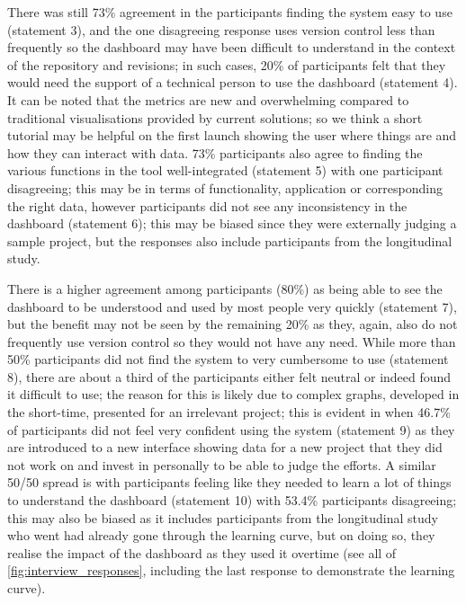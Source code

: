 \documentclass[../mpaper.tex]{subfiles}
\begin{document}
There was still 73\% agreement in the participants finding the system easy to use (statement 3), and the one disagreeing response uses version control less than frequently so the dashboard may have been difficult to understand in the context of the repository and revisions; in such cases, 20\% of participants felt that they would need the support of a technical person to use the dashboard (statement 4). It can be noted that the metrics are new and overwhelming compared to traditional visualisations provided by current solutions; so we think a short tutorial may be helpful on the first launch showing the user where things are and how they can interact with data. 73\% participants also agree to finding the various functions in the tool well-integrated (statement 5) with one participant disagreeing; this may be in terms of functionality, application or corresponding the right data, however participants did not see any inconsistency in the dashboard (statement 6); this may be biased since they were externally judging a sample project, but the responses also include participants from the longitudinal study.

There is a higher agreement among participants (80\%) as being able to see the dashboard to be understood and used by most people very quickly (statement 7), but the benefit may not be seen by the remaining 20\% as they, again, also do not frequently use version control so they would not have any need. While more than 50\% participants did not find the system to very cumbersome to use (statement 8), there are about a third of the participants either felt neutral or indeed found it difficult to use; the reason for this is likely due to complex graphs, developed in the short-time, presented for an irrelevant project; this is evident in when 46.7\% of participants did not feel very confident using the system (statement 9) as they are introduced to a new interface showing data for a new project that they did not work on and invest in personally to be able to judge the efforts. A similar 50/50 spread is with participants feeling like they needed to learn a lot of things to understand the dashboard (statement 10) with 53.4\% participants disagreeing; this may also be biased as it includes participants from the longitudinal study who went had already gone through the learning curve, but on doing so, they realise the impact of the dashboard as they used it overtime (see all of \autoref{fig:interview_responses}, including the last response to demonstrate the learning curve).
\end{document}
